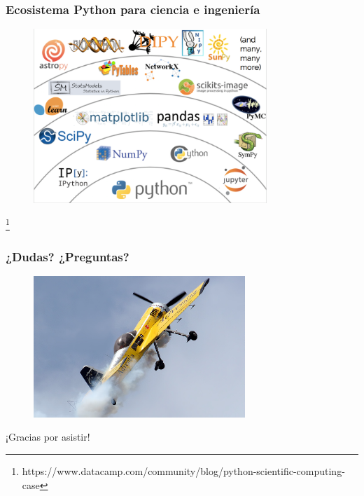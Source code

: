 \documentclass[18pt]{beamer}
\newcommand\blfootnote[1]{%
  \begingroup
  \renewcommand\thefootnote{}\footnote{#1}%
  \addtocounter{footnote}{-1}%
  \endgroup
}
\begin{document}
\begin{frame}

	\frametitle{Ecosistema Python para ciencia e ingeniería}
	
	\begin{figure}
		\includegraphics[width=8.8cm]{images/python_ecosystem.png}
	\end{figure}
	
	\blfootnote{\scriptsize https://www.datacamp.com/community/blog/python-scientific-computing-case}
	
\end{frame}



\begin{frame}

	\frametitle{¿Dudas? ¿Preguntas?}
	
	\begin{figure}
		\includegraphics[width=8cm]{images/Sukhoi_Su-31_Ramon_Alonso_EC-HGL.jpg}
	\end{figure}

	\begin{center}
		\Large ¡Gracias por asistir!
	\end{center}
	
\end{frame}

	
\end{document}
